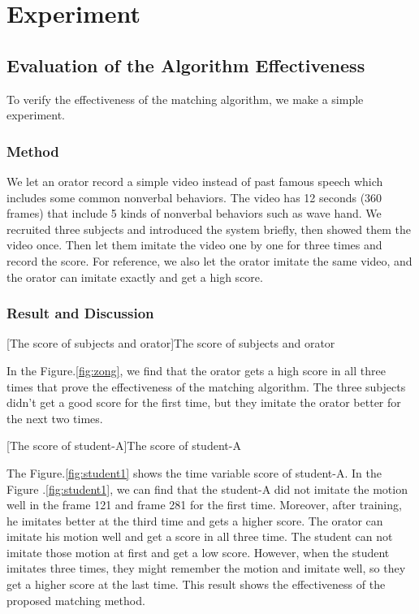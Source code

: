 \chapter{Experiment}
\section{Evaluation of the Algorithm Effectiveness}%
\label{sec:evaluation_of_the_system_effectiveness}

\par To verify the effectiveness of the matching algorithm, we make a simple experiment.
\subsection*{Method}
\par  We let an orator record a simple video instead of past famous speech which includes some common nonverbal behaviors. The video has 12 seconds (360 frames) that include 5 kinds of nonverbal behaviors such as wave hand. We recruited three subjects and introduced the system briefly, then showed them the video once. Then let them imitate the video one by one for three times and record the score. For reference, we also let the orator imitate the same video, and the orator can imitate exactly and get a high score.

\subsection*{Result and Discussion}

[The score of subjects and orator]{The score of subjects and orator}
\par In the Figure.\ref{fig:zong}, we find that the orator gets a high score in all three times that prove the effectiveness of the matching algorithm. The three subjects didn't get a good score for the first time, but they imitate the orator better for the next two times. 

[The score of student-A]{The score of student-A}
  \par The Figure.\ref{fig:student1} shows the time variable score of student-A. In the Figure .\ref{fig:student1}, we can find that the student-A did not imitate the motion well in the frame 121 and frame 281 for the first time. Moreover, after training, he imitates better at the third time and gets a higher score. The orator can imitate his motion well and get a score in all three time. The student can not imitate those motion at first and get a low score. However, when the student imitates three times, they might remember the motion and imitate well, so they get a higher score at the last time. This result shows the effectiveness of the proposed matching method.

